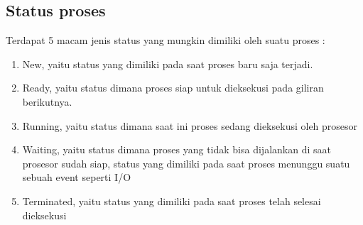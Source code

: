 	\subsection{Status proses}
	Terdapat 5 macam jenis status yang mungkin dimiliki oleh suatu proses :
	\begin{enumerate}
		\item New, yaitu status yang dimiliki pada saat proses baru saja terjadi.
		\item Ready, yaitu status dimana proses siap untuk dieksekusi pada giliran berikutnya.
		\item Running, yaitu status dimana saat ini proses sedang dieksekusi oleh prosesor
		\item Waiting, yaitu status dimana proses yang tidak bisa dijalankan di saat prosesor sudah siap, status yang dimiliki pada saat proses menunggu suatu sebuah event seperti I/O
		\item Terminated, yaitu status yang dimiliki pada saat proses telah selesai dieksekusi
	\end{enumerate}
	
